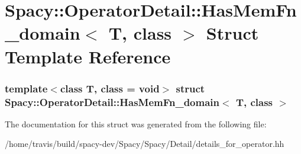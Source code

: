 \hypertarget{structSpacy_1_1OperatorDetail_1_1HasMemFn__domain}{\section{\-Spacy\-:\-:\-Operator\-Detail\-:\-:\-Has\-Mem\-Fn\-\_\-domain$<$ \-T, class $>$ \-Struct \-Template \-Reference}
\label{structSpacy_1_1OperatorDetail_1_1HasMemFn__domain}
}
\subsubsection*{template$<$class T, class = void$>$ struct Spacy\-::\-Operator\-Detail\-::\-Has\-Mem\-Fn\-\_\-domain$<$ T, class $>$}



\-The documentation for this struct was generated from the following file\-:\begin{DoxyCompactItemize}
\item 
/home/travis/build/spacy-\/dev/\-Spacy/\-Spacy/\-Detail/details\-\_\-for\-\_\-operator.\-hh\end{DoxyCompactItemize}
